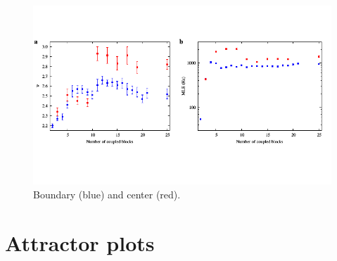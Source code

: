 \begin{figure}[H]
    \centering
    \includegraphics[width=\linewidth,trim={0 1.5cm 0 1.3cm},clip]
    {../blocks/data/nu_mle_blocks.pdf}
    \caption{Boundary (blue) and center (red).}
    \label{fig:nu mle blocks}
\end{figure}

\clearpage

\section{Attractor plots}

